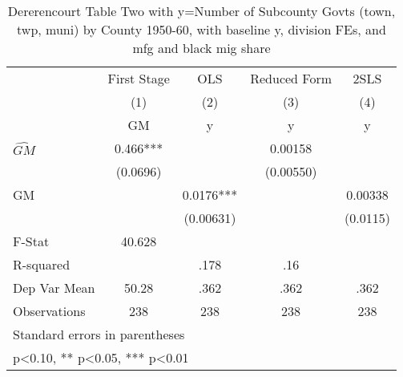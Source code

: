 \begin{table}[htbp]\centering
\def\sym#1{\ifmmode^{#1}\else\(^{#1}\)\fi}
\caption{Dererencourt Table Two with y=Number of Subcounty Govts (town, twp, muni) by County 1950-60, with baseline y, division FEs, and mfg and black mig share}
\begin{tabular}{l*{4}{c}}
\toprule
                    & First Stage   &         OLS   &Reduced Form   &        2SLS   \\
                    &\multicolumn{1}{c}{(1)}&\multicolumn{1}{c}{(2)}&\multicolumn{1}{c}{(3)}&\multicolumn{1}{c}{(4)}\\
                    &\multicolumn{1}{c}{GM}&\multicolumn{1}{c}{y}&\multicolumn{1}{c}{y}&\multicolumn{1}{c}{y}\\
\midrule
$\hat{GM}$          &       0.466***&               &     0.00158   &               \\
                    &    (0.0696)   &               &   (0.00550)   &               \\
\addlinespace
GM                  &               &      0.0176***&               &     0.00338   \\
                    &               &   (0.00631)   &               &    (0.0115)   \\
\midrule
F-Stat              &      40.628   &               &               &               \\
R-squared           &               &        .178   &         .16   &               \\
Dep Var Mean        &       50.28   &        .362   &        .362   &        .362   \\
Observations        &         238   &         238   &         238   &         238   \\
\bottomrule
\multicolumn{5}{l}{\footnotesize Standard errors in parentheses}\\
\multicolumn{5}{l}{\footnotesize * p<0.10, ** p<0.05, *** p<0.01}\\
\end{tabular}
\end{table}

